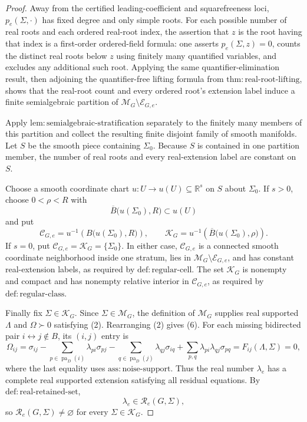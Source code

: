\documentclass{article}
\begin{document}
\begin{proof}
Away from the certified leading-coefficient and squarefreeness loci, \(p_e(\Sigma,\cdot)\) has fixed degree and only simple roots.  For each possible number of real roots and each ordered real-root index, the assertion that \(z\) is the root having that index is a first-order ordered-field formula: one asserts \(p_e(\Sigma,z)=0\), counts the distinct real roots below \(z\) using finitely many quantified variables, and excludes any additional such root.  Applying the same quantifier-elimination result, then adjoining the quantifier-free lifting formula from \(\mathrm{thm:real\mbox{-}root\mbox{-}lifting}\), shows that the real-root count and every ordered root's extension label induce a finite semialgebraic partition of \(\mathcal M_G\setminus\mathcal E_{G,e}\).

Apply \(\mathrm{lem:semialgebraic\mbox{-}stratification}\) separately to the finitely many members of this partition and collect the resulting finite disjoint family of smooth manifolds.  Let \(S\) be the smooth piece containing \(\Sigma_0\).  Because \(S\) is contained in one partition member, the number of real roots and every real-extension label are constant on \(S\).

Choose a smooth coordinate chart \(u:U\to u(U)\subseteq\mathbb R^s\) on \(S\) about \(\Sigma_0\).  If \(s>0\), choose \(0<\rho<R\) with
\[
 \overline B\bigl(u(\Sigma_0),R\bigr)\subset u(U)
\]
and put
\[
 \mathcal C_{G,e}=u^{-1}\!\left(B\bigl(u(\Sigma_0),R\bigr)\right),
 \qquad
 \mathcal K_G=u^{-1}\!\left(\overline B\bigl(u(\Sigma_0),\rho\bigr)\right).
\tag{7}
\]
If \(s=0\), put \(\mathcal C_{G,e}=\mathcal K_G=\{\Sigma_0\}\).  In either case, \(\mathcal C_{G,e}\) is a connected smooth coordinate neighborhood inside one stratum, lies in \(\mathcal M_G\setminus\mathcal E_{G,e}\), and has constant real-extension labels, as required by \(\mathrm{def:regular\mbox{-}cell}\).  The set \(\mathcal K_G\) is nonempty and compact and has nonempty relative interior in \(\mathcal C_{G,e}\), as required by \(\mathrm{def:regular\mbox{-}class}\).

Finally fix \(\Sigma\in\mathcal K_G\).  Since \(\Sigma\in\mathcal M_G\), the definition of \(\mathcal M_G\) supplies real supported \(\Lambda\) and \(\Omega\succ0\) satisfying (2).  Rearranging (2) gives (6).  For each missing bidirected pair \(i\leftrightarrow j\notin B\), its \((i,j)\) entry is
\[
 \Omega_{ij}
 =\sigma_{ij}
 -\sum_{p\in\operatorname{pa}_D(i)}\lambda_{pi}\sigma_{pj}
 -\sum_{q\in\operatorname{pa}_D(j)}\lambda_{qj}\sigma_{iq}
 +\sum_{p,q}\lambda_{pi}\lambda_{qj}\sigma_{pq}
 =F_{ij}(\Lambda,\Sigma)=0,
\tag{8}
\]
where the last equality uses \(\mathrm{ass:noise\mbox{-}support}\).  Thus the real number \(\lambda_e\) has a complete real supported extension satisfying all residual equations.  By \(\mathrm{def:real\mbox{-}retained\mbox{-}set}\),
\[
 \lambda_e\in\mathcal R_e(G,\Sigma),
\]
so \(\mathcal R_e(G,\Sigma)\ne\varnothing\) for every \(\Sigma\in\mathcal K_G\).
\end{proof}
\end{document}
